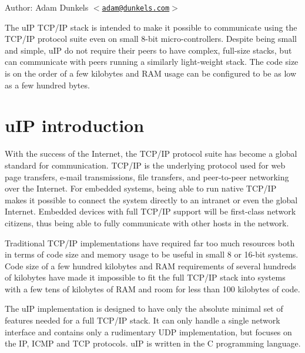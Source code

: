\begin{Desc}
\item[Author:]Adam Dunkels $<$\href{mailto:adam@dunkels.com}{\tt adam@dunkels.com}$>$\end{Desc}
The u\-IP TCP/IP stack is intended to make it possible to communicate using the TCP/IP protocol suite even on small 8-bit micro-controllers. Despite being small and simple, u\-IP do not require their peers to have complex, full-size stacks, but can communicate with peers running a similarly light-weight stack. The code size is on the order of a few kilobytes and RAM usage can be configured to be as low as a few hundred bytes.\hypertarget{main_uIPIntroduction}{}\section{u\-IP introduction}\label{main_uIPIntroduction}
With the success of the Internet, the TCP/IP protocol suite has become a global standard for communication. TCP/IP is the underlying protocol used for web page transfers, e-mail transmissions, file transfers, and peer-to-peer networking over the Internet. For embedded systems, being able to run native TCP/IP makes it possible to connect the system directly to an intranet or even the global Internet. Embedded devices with full TCP/IP support will be first-class network citizens, thus being able to fully communicate with other hosts in the network.

Traditional TCP/IP implementations have required far too much resources both in terms of code size and memory usage to be useful in small 8 or 16-bit systems. Code size of a few hundred kilobytes and RAM requirements of several hundreds of kilobytes have made it impossible to fit the full TCP/IP stack into systems with a few tens of kilobytes of RAM and room for less than 100 kilobytes of code.

The u\-IP implementation is designed to have only the absolute minimal set of features needed for a full TCP/IP stack. It can only handle a single network interface and contains only a rudimentary UDP implementation, but focuses on the IP, ICMP and TCP protocols. u\-IP is written in the C programming language.

